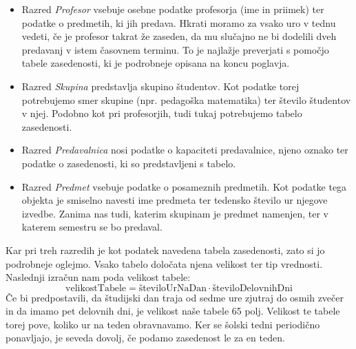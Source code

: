 \documentclass[a4paper,10pt]{article}
\begin{document}


\begin{itemize}
      \item Razred \emph{Profesor} vsebuje osebne podatke profesorja (ime in priimek) ter
      podatke o predmetih, ki jih predava. Hkrati moramo za vsako uro v tednu vedeti, če
      je profesor takrat že zaseden, da mu slučajno ne bi dodelili dveh predavanj v istem
      časovnem terminu. To je najlažje preverjati s pomočjo tabele zasedenosti, ki je
      podrobneje opisana na koncu poglavja.
   
      \item Razred \emph{Skupina} predstavlja skupino študentov. Kot podatke torej potrebujemo
      smer skupine (npr. pedagoška matematika) ter število študentov v njej. Podobno kot pri
      profesorjih, tudi tukaj potrebujemo tabelo zasedenosti.
   
      \item Razred \emph{Predavalnica} nosi podatke o kapaciteti predavalnice, njeno oznako
      ter podatke o zasedenosti, ki so predstavljeni s tabelo.
   
      \item Razred \emph{Predmet} vsebuje podatke o posameznih predmetih. Kot podatke tega
      objekta je smiselno navesti ime predmeta ter tedensko število ur njegove izvedbe.
      Zanima nas tudi, katerim skupinam je predmet namenjen, ter v katerem semestru se bo
      predaval.
\end{itemize}
\noindent
Kar pri treh razredih je kot podatek navedena tabela zasedenosti, zato si jo podrobneje
oglejmo. Vsako tabelo določata njena velikost ter tip vrednosti. Naslednji izračun nam
poda velikost tabele:
\[\text{velikostTabele} = \text{številoUrNaDan} \cdot \text{številoDelovnihDni}\]
Če bi predpostavili, da študijski dan traja od sedme ure zjutraj do osmih zvečer in da
imamo pet delovnih dni, je velikost naše tabele 65 polj. Velikost te tabele torej pove,
koliko ur na teden obravnavamo. Ker se šolski tedni periodično ponavljajo, je seveda
dovolj, če podamo zasedenost le za en teden.
\end{document}
